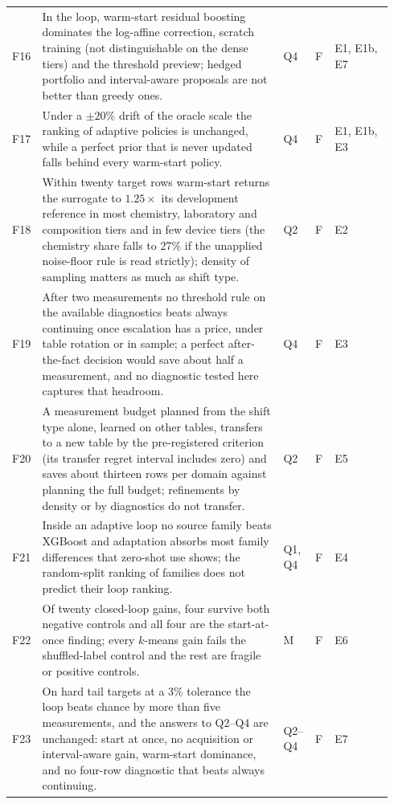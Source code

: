 \documentclass[11pt,a4paper]{article}
\begin{document}
{\begin{longtable}{@{}p{0.04\linewidth}p{0.625\linewidth}p{0.075\linewidth}p{0.055\linewidth}p{0.15\linewidth}@{}}
F16 & In the loop, warm-start residual boosting dominates the log-affine correction, scratch training (not distinguishable on the dense tiers) and the threshold preview; hedged portfolio and interval-aware proposals are not better than greedy ones. & Q4 & F & E1, E1b, E7 \\
F17 & Under a $\pm 20\%$ drift of the oracle scale the ranking of adaptive policies is unchanged, while a perfect prior that is never updated falls behind every warm-start policy. & Q4 & F & E1, E1b, E3 \\
F18 & Within twenty target rows warm-start returns the surrogate to $1.25 \times$ its development reference in most chemistry, laboratory and composition tiers and in few device tiers (the chemistry share falls to 27\% if the unapplied noise-floor rule is read strictly); density of sampling matters as much as shift type. & Q2 & F & E2 \\
F19 & After two measurements no threshold rule on the available diagnostics beats always continuing once escalation has a price, under table rotation or in sample; a perfect after-the-fact decision would save about half a measurement, and no diagnostic tested here captures that headroom. & Q4 & F & E3 \\
F20 & A measurement budget planned from the shift type alone, learned on other tables, transfers to a new table by the pre-registered criterion (its transfer regret interval includes zero) and saves about thirteen rows per domain against planning the full budget; refinements by density or by diagnostics do not transfer. & Q2 & F & E5 \\
F21 & Inside an adaptive loop no source family beats XGBoost and adaptation absorbs most family differences that zero-shot use shows; the random-split ranking of families does not predict their loop ranking. & Q1, Q4 & F & E4 \\
F22 & Of twenty closed-loop gains, four survive both negative controls and all four are the start-at-once finding; every $k$-means gain fails the shuffled-label control and the rest are fragile or positive controls. & M & F & E6 \\
F23 & On hard tail targets at a 3\% tolerance the loop beats chance by more than five measurements, and the answers to Q2--Q4 are unchanged: start at once, no acquisition or interval-aware gain, warm-start dominance, and no four-row diagnostic that beats always continuing. & Q2--Q4 & F & E7 \\
\end{longtable}
}
\end{document}
